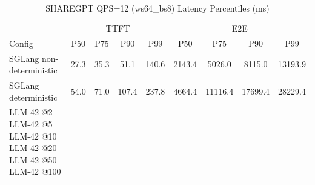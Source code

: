 \begin{table}[htbp]
\centering
\caption{SHAREGPT QPS=12 (ws64_bs8) Latency Percentiles (ms)}
\label{tab:sharegpt_qps12_ws64_bs8}
\begin{tabular}{l|cccc|cccc}
\toprule
& \multicolumn{4}{c|}{TTFT} & \multicolumn{4}{c}{E2E} \\
Config & P50 & P75 & P90 & P99 & P50 & P75 & P90 & P99 \\
\midrule
SGLang non-deterministic & 27.3 & 35.3 & 51.1 & 140.6 & 2143.4 & 5026.0 & 8115.0 & 13193.9 \\
SGLang deterministic & 54.0 & 71.0 & 107.4 & 237.8 & 4664.4 & 11116.4 & 17699.4 & 28229.4 \\
LLM-42 @2%
LLM-42 @5%
LLM-42 @10%
LLM-42 @20%
LLM-42 @50%
LLM-42 @100%
\bottomrule
\end{tabular}
\end{table}
